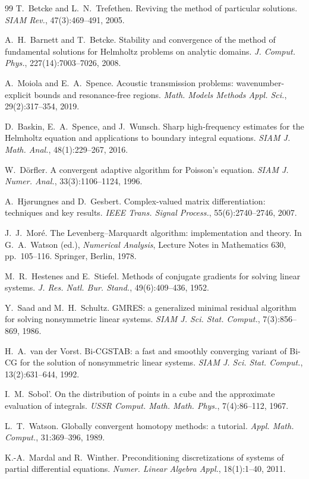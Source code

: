 \documentclass[pdflatex,sn-mathphys-num]{sn-jnl}
\theoremstyle{thmstyleone}
\theoremstyle{thmstyletwo}
\begin{document}
\begin{thebibliography}{99}
T.~Betcke and L.~N.~Trefethen.
\newblock Reviving the method of particular solutions.
\newblock \emph{SIAM Rev.}, 47(3):469--491, 2005.

A.~H.~Barnett and T.~Betcke.
\newblock Stability and convergence of the method of fundamental solutions for Helmholtz problems on analytic domains.
\newblock \emph{J. Comput. Phys.}, 227(14):7003--7026, 2008.

A.~Moiola and E.~A.~Spence.
\newblock Acoustic transmission problems: wavenumber-explicit bounds and resonance-free regions.
\newblock \emph{Math. Models Methods Appl. Sci.}, 29(2):317--354, 2019.

D.~Baskin, E.~A.~Spence, and J.~Wunsch.
\newblock Sharp high-frequency estimates for the Helmholtz equation and applications to boundary integral equations.
\newblock \emph{SIAM J. Math. Anal.}, 48(1):229--267, 2016.

W.~D\"orfler.
\newblock A convergent adaptive algorithm for Poisson's equation.
\newblock \emph{SIAM J. Numer. Anal.}, 33(3):1106--1124, 1996.

A.~Hj\o rungnes and D.~Gesbert.
\newblock Complex-valued matrix differentiation: techniques and key results.
\newblock \emph{IEEE Trans. Signal Process.}, 55(6):2740--2746, 2007.

J.~J.~Mor\'e.
\newblock The Levenberg--Marquardt algorithm: implementation and theory.
\newblock In G.~A.~Watson (ed.), \emph{Numerical Analysis}, Lecture Notes in Mathematics 630, pp.~105--116. Springer, Berlin, 1978.

M.~R.~Hestenes and E.~Stiefel.
\newblock Methods of conjugate gradients for solving linear systems.
\newblock \emph{J. Res. Natl. Bur. Stand.}, 49(6):409--436, 1952.

Y.~Saad and M.~H.~Schultz.
\newblock GMRES: a generalized minimal residual algorithm for solving nonsymmetric linear systems.
\newblock \emph{SIAM J. Sci. Stat. Comput.}, 7(3):856--869, 1986.

H.~A.~van der Vorst.
\newblock Bi-CGSTAB: a fast and smoothly converging variant of Bi-CG for the solution of nonsymmetric linear systems.
\newblock \emph{SIAM J. Sci. Stat. Comput.}, 13(2):631--644, 1992.

I.~M.~Sobol'.
\newblock On the distribution of points in a cube and the approximate evaluation of integrals.
\newblock \emph{USSR Comput. Math. Math. Phys.}, 7(4):86--112, 1967.

L.~T.~Watson.
\newblock Globally convergent homotopy methods: a tutorial.
\newblock \emph{Appl. Math. Comput.}, 31:369--396, 1989.

K.-A.~Mardal and R.~Winther.
\newblock Preconditioning discretizations of systems of partial differential equations.
\newblock \emph{Numer. Linear Algebra Appl.}, 18(1):1--40, 2011.
\end{thebibliography}
\end{document}
